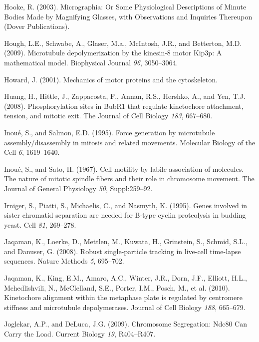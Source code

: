 \documentclass[12pt,a4paper,twoside,openright]{book}
\begin{document}
\hypertarget{ref-hooke2003micrographia}{}
Hooke, R. (2003). Micrographia: Or Some Physiological Descriptions of
Minute Bodies Made by Magnifying Glasses, with Observations and
Inquiries Thereupon (Dover Publications).

\hypertarget{ref-Hough2009}{}
Hough, L.E., Schwabe, A., Glaser, M.a., McIntosh, J.R., and Betterton,
M.D. (2009). Microtubule depolymerization by the kinesin-8 motor Kip3p:
A mathematical model. Biophysical Journal \emph{96}, 3050--3064.

\hypertarget{ref-Howard2001}{}
Howard, J. (2001). Mechanics of motor proteins and the cytoskeleton.

\hypertarget{ref-Huang2008}{}
Huang, H., Hittle, J., Zappacosta, F., Annan, R.S., Hershko, A., and
Yen, T.J. (2008). Phosphorylation sites in BubR1 that regulate
kinetochore attachment, tension, and mitotic exit. The Journal of Cell
Biology \emph{183}, 667--680.

\hypertarget{ref-Inoue1995}{}
Inoué, S., and Salmon, E.D. (1995). Force generation by microtubule
assembly/disassembly in mitosis and related movements. Molecular Biology
of the Cell \emph{6}, 1619--1640.

\hypertarget{ref-Inoue1967}{}
Inoué, S., and Sato, H. (1967). Cell motility by labile association of
molecules. The nature of mitotic spindle fibers and their role in
chromosome movement. The Journal of General Physiology \emph{50},
Suppl:259--92.

\hypertarget{ref-Irniger1995}{}
Irniger, S., Piatti, S., Michaelis, C., and Nasmyth, K. (1995). Genes
involved in sister chromatid separation are needed for B-type cyclin
proteolysis in budding yeast. Cell \emph{81}, 269--278.

\hypertarget{ref-Jaqaman2008}{}
Jaqaman, K., Loerke, D., Mettlen, M., Kuwata, H., Grinstein, S., Schmid,
S.L., and Danuser, G. (2008). Robust single-particle tracking in
live-cell time-lapse sequences. Nature Methods \emph{5}, 695--702.

\hypertarget{ref-Jaqaman2010}{}
Jaqaman, K., King, E.M., Amaro, A.C., Winter, J.R., Dorn, J.F., Elliott,
H.L., Mchedlishvili, N., McClelland, S.E., Porter, I.M., Posch, M., et
al. (2010). Kinetochore alignment within the metaphase plate is
regulated by centromere stiffness and microtubule depolymerases. Journal
of Cell Biology \emph{188}, 665--679.

\hypertarget{ref-Joglekar2009}{}
Joglekar, A.P., and DeLuca, J.G. (2009). Chromosome Segregation: Ndc80
Can Carry the Load. Current Biology \emph{19}, R404--R407.
\end{document}
